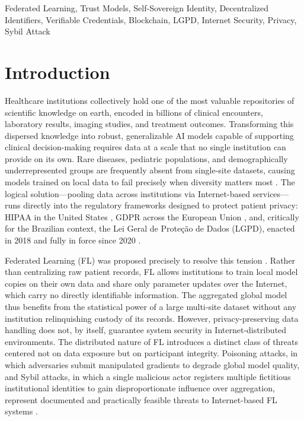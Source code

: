 \documentclass{sbc2023}
\begin{document}
\begin{frontmatter}
\begin{keywords}
Federated Learning, Trust Models, Self-Sovereign Identity, Decentralized Identifiers, Verifiable Credentials, Blockchain, LGPD, Internet Security, Privacy, Sybil Attack
\end{keywords}

\end{frontmatter}


\section{Introduction}
\label{sec:intro}

Healthcare institutions collectively hold one of the most valuable repositories of scientific knowledge on earth, encoded in billions of clinical encounters, laboratory results, imaging studies, and treatment outcomes. Transforming this dispersed knowledge into robust, generalizable AI models capable of supporting clinical decision-making requires data at a scale that no single institution can provide on its own. Rare diseases, pediatric populations, and demographically underrepresented groups are frequently absent from single-site datasets, causing models trained on local data to fail precisely when diversity matters most \citep{9146114}. The logical solution---pooling data across institutions via Internet-based services---runs directly into the regulatory frameworks designed to protect patient privacy: HIPAA in the United States \citep{10.1145/1273353.1273354}, GDPR across the European Union \citep{10.1145/3675888.3676142}, and, critically for the Brazilian context, the Lei Geral de Prote\c{c}\~{a}o de Dados (LGPD), enacted in 2018 and fully in force since 2020 \citep{LGPD2018}.

Federated Learning (FL) was proposed precisely to resolve this tension \citep{mcmahan2017communication}. Rather than centralizing raw patient records, FL allows institutions to train local model copies on their own data and share only parameter updates over the Internet, which carry no directly identifiable information. The aggregated global model thus benefits from the statistical power of a large multi-site dataset without any institution relinquishing custody of its records. However, privacy-preserving data handling does not, by itself, guarantee system security in Internet-distributed environments. The distributed nature of FL introduces a distinct class of threats centered not on data exposure but on participant integrity. Poisoning attacks, in which adversaries submit manipulated gradients to degrade global model quality, and Sybil attacks, in which a single malicious actor registers multiple fictitious institutional identities to gain disproportionate influence over aggregation, represent documented and practically feasible threats to Internet-based FL systems \citep{10.1007/978-981-99-7032-2_3, qammar2023securing}.
\end{document}
